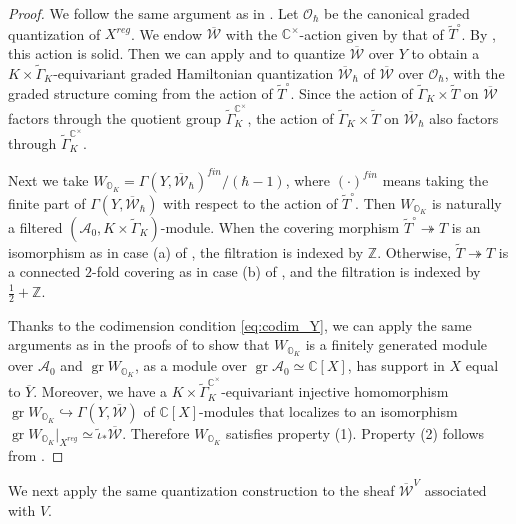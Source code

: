 \documentclass[11pt, a4paper]{amsart}
\newcommand{\C}{\mathbb{C}}
\newcommand{\orb}{\mathbb{O}}
\newcommand{\orbk}{\orb_{K}}
\newcommand{\Z}{\mathbb{Z}}
\newcommand{\gr}{\operatorname{gr}}
\newcommand{\cA}{\mathcal{A}}
\newcommand{\cW}{\mathcal{W}}
\newcommand{\hb}{\hbar}
\newcommand{\cWVbar}{\overline{\cW}^{\scriptscriptstyle V}}
\newcommand{\tGamma}{\widetilde{\Gamma}}
\newcommand{\cm}{\C^\times}
\newcommand{\OO}{\mathcal{O}}
\theoremstyle{definition}
\numberwithin{equation}{section}
\begin{document}
\begin{proof}
	We follow the same argument as in \cite[Section 7.2]{LY}. Let $\OO_\hb$ be the canonical graded quantization of $X^{reg}$. We endow $\overline{\cW}$ with the $\cm$-action given by that of $\widetilde{T}^\circ$. By , this action is solid. Then we can apply  and  to quantize $\overline{\cW}$ over $Y$ to obtain a $K \times \tGamma_K$-equivariant graded Hamiltonian quantization $\overline{\cW}_\hb$ of $\overline{\cW}$ over $\OO_\hb$, with the graded structure coming from the action of $\widetilde{T}^\circ$. Since the action of $\tGamma_K \times \widetilde{T}$ on $\overline{\cW}$ factors through the quotient group $\tGamma_K^{\cm}$, the action of $\tGamma_K \times \widetilde{T}$ on $\overline{\cW}_\hb$ also factors through $\tGamma_K^{\cm}$.
	
	
	Next we take $W_{\orbk} = \Gamma(Y, \overline{\cW}_\hb)^{fin}/(\hb-1)$, where $(\cdot)^{fin}$ means taking the finite part of $\Gamma(Y, \overline{\cW}_\hb)$ with respect to the action of $\widetilde{T}^\circ$. Then $W_{\orbk}$ is naturally a filtered $(\cA_0, K \times \tGamma_K)$-module. When the covering morphism $\widetilde{T}^\circ \twoheadrightarrow T$ is an isomorphism as in case (a) of , the filtration is indexed by $\Z$. Otherwise, $\widetilde{T} \twoheadrightarrow T$ is a connected $2$-fold covering as in case (b) of , and the filtration is indexed by $\frac{1}{2} + \Z$.
	
	Thanks to the codimension condition \eqref{eq:codim_Y}, we can apply the same arguments as in the proofs of \cite[Theorem 7.2.3 and Proposition 7.3.1]{LY} to show that $W_{\orbk}$ is a finitely generated module over $\cA_0$ and $\gr W_{\orbk}$, as a module over $\gr\cA_0 \simeq \C[X]$, has support in $X$ equal to $\overline{Y}$. Moreover, we have a $K \times \tGamma_K^{\cm}$-equivariant injective homomorphism $\gr W_{\orbk} \hookrightarrow \Gamma(Y,\overline{\cW})$ of $\C[X]$-modules that localizes to an isomorphism $\gr W_{\orbk}|_{X^{reg}} \simeq \tilde{\iota}_* \overline{\cW}$. Therefore $W_{\orbk}$ satisfies property (1). Property (2) follows from .
\end{proof}


We next apply the same quantization construction to the sheaf $\cWVbar$ associated with $V$.
\end{document}
